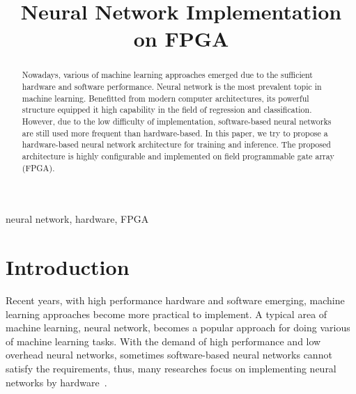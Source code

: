 \documentclass[conference]{IEEEtran}
\begin{document}
\title{Neural Network Implementation on FPGA}

\author{
\and
{}
}

\maketitle

\begin{abstract}
Nowadays, various of machine learning approaches emerged due to the sufficient hardware and software performance. Neural network is the most prevalent topic in machine learning. Benefitted from modern computer architectures, its powerful structure equipped it high capability in the field of regression and classification. However, due to the low difficulty of implementation, software-based neural networks are still used more frequent than hardware-based. In this paper, we try to propose a hardware-based neural network architecture for training and inference. The proposed architecture is highly configurable and implemented on field programmable gate array (FPGA).
\end{abstract}

\begin{IEEEkeywords}
neural network, hardware, FPGA
\end{IEEEkeywords}

\section{Introduction}

Recent years, with high performance hardware and software emerging, machine learning approaches become more practical to implement. A typical area of machine learning, neural network, becomes a popular approach for doing various of machine learning tasks. With the demand of high performance and low overhead neural networks, sometimes software-based neural networks cannot satisfy the requirements, thus, many researches focus on implementing neural networks by hardware~\cite{hwsurvey}. 
\end{document}

